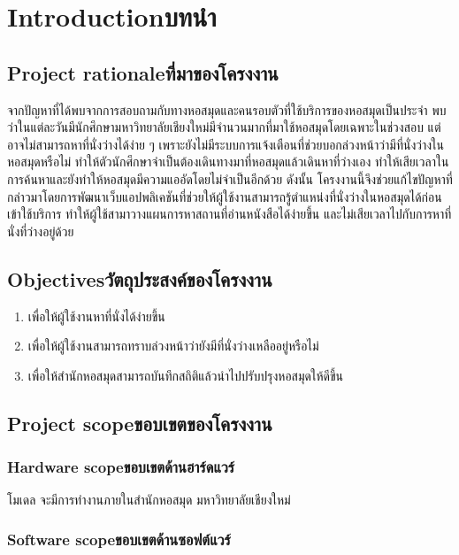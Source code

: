 \chapter{\ifenglish Introduction\else บทนำ\fi}

\section{\ifenglish Project rationale\else ที่มาของโครงงาน\fi}
จากปัญหาที่ได้พบจากการสอบถามกับทางหอสมุดและคนรอบตัวที่ใช้บริการของหอสมุดเป็นประจำ พบว่าในแต่ละวันมีนักศึกษามหาวิทยาลัยเชียงใหม่มีจำนวนมากที่มาใช้หอสมุดโดยเฉพาะในช่วงสอบ แต่อาจไม่สามารถหาที่นั่งว่างได้ง่าย ๆ 
เพราะยังไม่มีระบบการแจ้งเตือนที่ช่วยบอกล่วงหน้าว่ามีที่นั่งว่างในหอสมุดหรือไม่ ทำให้ตัวนักศึกษาจำเป็นต้องเดินทางมาที่หอสมุดแล้วเดินหาที่ว่างเอง ทำให้เสียเวลาในการค้นหาและยังทำให้หอสมุดมีความแออัดโดยไม่จำเป็นอีกด้วย
ดังนั้น โครงงานนี้จึงช่วยแก้ไขปัญหาที่กล่าวมาโดยการพัฒนาเว็บแอปพลิเคชันที่ช่วยให้ผู้ใช้งานสามารถรู้ตำแหน่งที่นั่งว่างในหอสมุดได้ก่อนเข้าใช้บริการ ทำให้ผู้ใช้สามาวางแผนการหาสถานที่อ่านหนังสือได้ง่ายขึ้น 
และไม่เสียเวลาไปกับการหาที่นั่งที่ว่างอยู่ด้วย
\section{\ifenglish Objectives\else วัตถุประสงค์ของโครงงาน\fi}
\begin{enumerate}
    \item เพื่อให้ผู้ใช้งานหาที่นั่งได้ง่ายขึ้น
    \item เพื่อให้ผู้ใช้งานสามารถทราบล่วงหน้าว่ายังมีที่นั่งว่างเหลืออยู่หรือไม่ 
    \item เพื่อให้สำนักหอสมุดสามารถบันทึกสถิติแล้วนำไปปรับปรุงหอสมุดให้ดีขึ้น
\end{enumerate}

\section{\ifenglish Project scope\else ขอบเขตของโครงงาน\fi}

\subsection{\ifenglish Hardware scope\else ขอบเขตด้านฮาร์ดแวร์\fi}
โมเดล จะมีการทำงานภายในสำนักหอสมุด มหาวิทยาลัยเชียงใหม่
\subsection{\ifenglish Software scope\else ขอบเขตด้านซอฟต์แวร์\fi}

